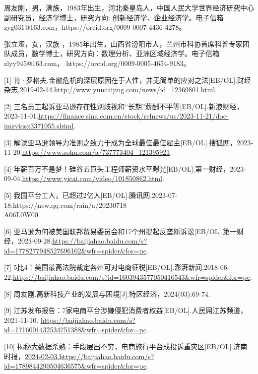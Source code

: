 \documentclass[12pt,twoside,utf8]{ctexart}
\begin{document}
\fzfs



\hspace*{\fill}


 

\setlength{\parindent}{0pt}

\fangsong  周友刚，男，满族，1983年出生，河北秦皇岛人，中国人民大学世界经济研究中心副研究员，经济学博士，研究方向: 创新经济学、企业经济学。电子信箱 zyg031@163.com，https://orcid.org/0009-0007-4436-4278。

张立垭，女，汉族 ，1985年出生，山西省汾阳市人，兰州市科协首席科普专家团队成员，数学博士，研究方向：数理分析、亚洲区域经济学。电子信箱 zlyy945@163.com， https://orcid.org/0009-0005-4654-9183。 




[1] 肯·罗格夫.金融危机的深层原因在于人性，并无简单的应对之法[EB/OL].财经杂志,2019-02-14.\url {http://www.yuncaijing.com/news/id_12369801.html}.

[2] 三名员工起诉亚马逊存在性别歧视和“长期”薪酬不平等[EB/OL].新浪财经，2023-11-01.\url {https://finance.sina.com.cn/stock/relnews/us/2023-11-21/doc-imzviqsx3371055.shtml}.

[3] 解读亚马逊领导力准则之致力于成为全球最佳最佳雇主[EB/OL].搜狐网，2023-11-20.\url {https://www.sohu.com/a/737773404_121395921}.

[4] 年薪百万不是梦！硅谷五巨头工程师薪资水平曝光[EB/OL].第一财经，2023-09-04.\url {https://www.yicai.com/video/101850862.html}.

[5] 我国平台工人，已超过2亿人[EB/OL].腾讯网,2023-07-18.https://new.qq.com/rain/a/20230718\\A06L0W00.

[6] 亚马逊为何被美国联邦贸易委员会和17个州提起反垄断诉讼[EB/OL].第一财经，2023-09-28.\url {https://baijiahao.baidu.com/s?id=1778277948527696102&wfr=spider&for=pc}.

[7] 5比4！美国最高法院裁定各州可对电商征税[EB/OL].澎湃新闻,2018-06-22.\url {https://baijiahao.baidu.com/s?id=1603943577050416543&wfr=spider&for=pc}.

[8] 周友刚.高新科技产业的发展与困境[J].特区经济，2024(03):69-74.

[9] 江苏发布报告：7家电商平台涉嫌侵犯消费者权益[EB/OL].人民网江苏频道，2021-11-10. \url {https://baijiahao.baidu.com/s?id=1716001432534751388&wfr=spider&for=pc}.

[10] 揭秘大数据杀熟：手段层出不穷，电商旅行平台成投诉重灾区[EB/OL].济南时报，\url {2024-02-03.https://baijiahao.baidu.com/s?id=1789844290504636575&wfr=spider&for=pc}.



\hspace*{\fill}




\end{document}
